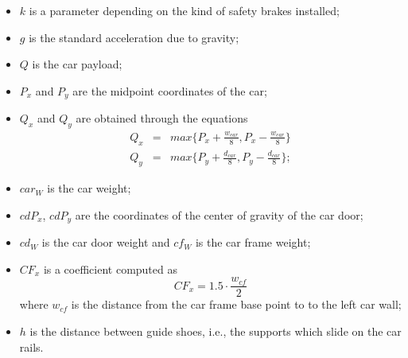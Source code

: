 \begin{itemize}
	\item $k$ is a parameter depending on the kind
	of safety brakes installed;
	\item $g$ is the standard acceleration due to gravity;
	\item $Q$ is the car payload;
	\item $P_x$ and $P_y$ are the midpoint coordinates of the car;
	\item $Q_x$ and $Q_y$ are obtained through the equations
	\begin{equation*}
		\begin{array}{rcl}
			Q_x & = & max{\{P_x + \frac{w_{car}}{8}, P_x - \frac{w_{car}}{8}\}} \\
			Q_y & = & max{\{P_y + \frac{d_{car}}{8}, P_y - \frac{d_{car}}{8}\}};
		\end{array}
	\end{equation*}
	\item $car_W$ is the car weight;
	\item $cdP_x$, $cdP_y$ are the coordinates of the center of gravity of
	the car door;
	\item $cd_W$ is the car door weight and $cf_W$ is the car frame weight;
	\item $CF_x$ is a coefficient computed as
	\begin{equation*}
		CF_x = 1.5 \cdot\frac{w_{cf}}{2}
	\end{equation*}
	where $w_{cf}$ is the distance from the car frame base point to to
	the left car wall;
	\item $h$ is the distance between guide shoes, i.e., the supports 
	which slide on the car rails.
\end{itemize}

